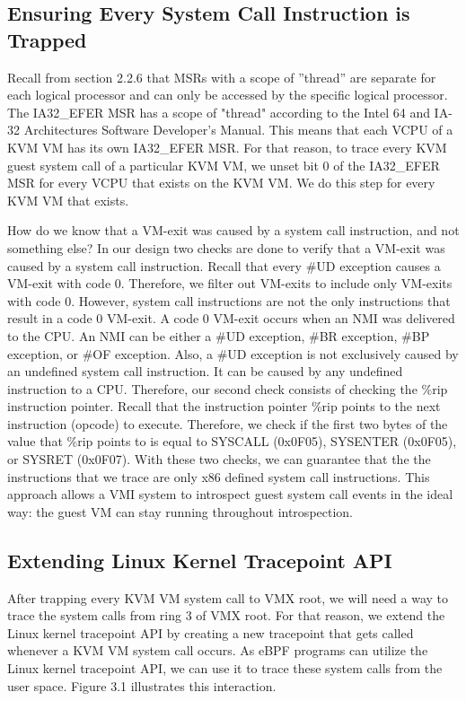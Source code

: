 \documentclass{report}
\begin{document}
\begin{spacing}{1.5}
\subsection{Ensuring Every System Call Instruction is Trapped}
{\large
Recall from section 2.2.6 that MSRs with a scope of ”thread” are separate for each logical processor and can only be accessed by the specific logical processor. The IA32\_EFER MSR has a scope of "thread" according to the Intel 64 and IA-32 Architectures Software Developer’s Manual. This means that each VCPU of a KVM VM has its own IA32\_EFER MSR. For that reason, to trace every KVM guest system call of a particular KVM VM, we unset bit 0 of the IA32\_EFER MSR for every VCPU that exists on the KVM VM. We do this step for every KVM VM that exists. 
\leavevmode\newline
}

{\large
How do we know that a VM-exit was caused by a system call instruction, and not something else? In our design two checks are done to verify that a VM-exit was caused by a system call instruction. Recall that every \#UD exception causes a VM-exit with code 0. Therefore, we filter out VM-exits to include only VM-exits with code 0. However, system call instructions are not the only instructions that result in a code 0 VM-exit. A code 0 VM-exit occurs when an NMI was delivered to the CPU. An NMI can be either a \#UD exception, \#BR exception, \#BP exception, or \#OF exception. Also, a \#UD exception is not exclusively caused by an undefined system call instruction. It can be caused by any undefined instruction to a CPU. Therefore, our second check consists of checking the \%rip instruction pointer. Recall that the instruction pointer \%rip points to the next instruction (opcode) to execute. Therefore, we check if the first two bytes of the value that \%rip points to is equal to SYSCALL (0x0F05), SYSENTER (0x0F05), or SYSRET (0x0F07). With these two checks, we can guarantee that the the instructions that we trace are only x86 defined system call instructions. This approach allows a VMI system to introspect guest system call events in the ideal way: the guest VM can stay running throughout introspection.
\leavevmode\newline
}


\subsection{Extending Linux Kernel Tracepoint API}
{\large
After trapping every KVM VM system call to VMX root, we  will need a way to trace the system calls from ring 3 of VMX root. For that reason, we extend the Linux kernel tracepoint API by creating a new tracepoint that gets called whenever a KVM VM system call occurs. As eBPF programs can utilize the Linux kernel tracepoint API, we can use it to trace these system calls from the user space. Figure 3.1 illustrates this interaction.
\leavevmode\newline
}












\end{spacing}
\end{document}
